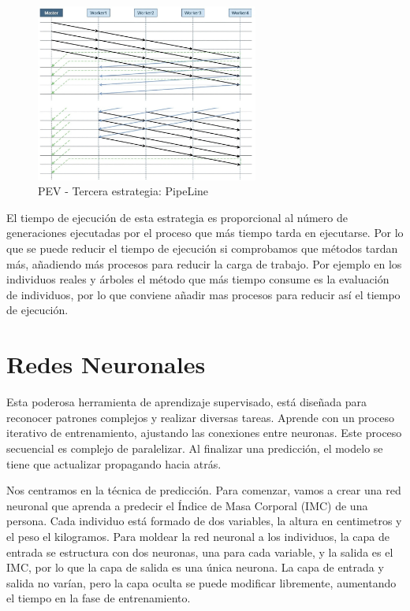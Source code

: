 	
		
	\begin{figure}[!h]
		\centering
		\includegraphics[width=0.65\textwidth]{images/chapter_3/pev_mpi3}
		\caption{PEV - Tercera estrategia: PipeLine }
		\label{fig:pevpipe}
	\end{figure}

	El tiempo de ejecución de esta estrategia es proporcional al número de generaciones ejecutadas por el proceso que más tiempo tarda en ejecutarse. Por lo que se puede reducir el tiempo de ejecución si comprobamos que métodos tardan más, añadiendo más procesos para reducir la carga de trabajo. Por ejemplo en los individuos reales y árboles el método que más tiempo consume es la evaluación de individuos, por lo que conviene añadir mas procesos para reducir así el tiempo de ejecución.
	
	
	
	
	
\newpage

\section{Redes Neuronales}
\label{cap:3_5}
	Esta poderosa herramienta de aprendizaje supervisado, está diseñada para reconocer patrones complejos y realizar diversas tareas. Aprende con un proceso iterativo de entrenamiento, ajustando las conexiones entre neuronas. Este proceso secuencial es complejo de paralelizar. Al finalizar una predicción, el modelo se tiene que actualizar propagando hacia atrás.
	
	Nos centramos en la técnica de predicción. Para comenzar, vamos a crear una red neuronal que aprenda a predecir el Índice de Masa Corporal (IMC) de una persona. Cada individuo está formado de dos variables, la altura en centimetros y el peso el kilogramos. Para moldear la red neuronal a los individuos, la capa de entrada se estructura con dos neuronas, una para cada variable, y la salida es el IMC, por lo que la capa de salida es una única neurona. La capa de entrada y salida no varían, pero la capa oculta se puede modificar libremente, aumentando el tiempo en la fase de entrenamiento.
	
